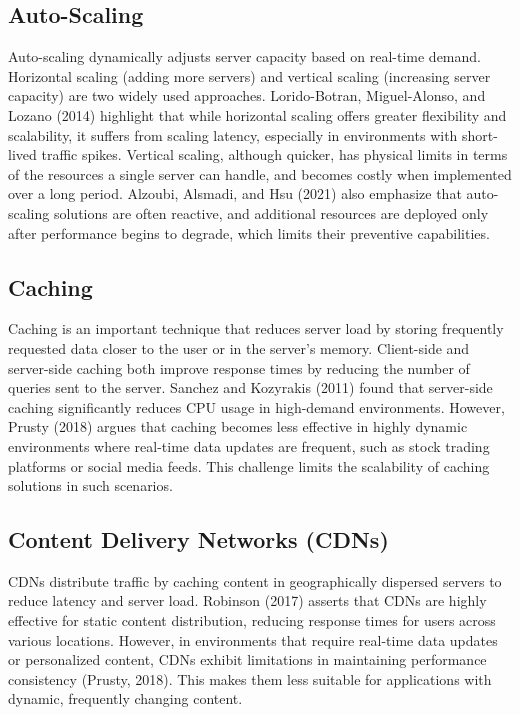 \documentclass[a4paper, 12pt]{article}
\begin{document}
\subsection{Auto-Scaling}

Auto-scaling dynamically adjusts server capacity based on real-time demand. Horizontal scaling (adding more servers) and vertical scaling (increasing server capacity) are two widely used approaches. Lorido-Botran, Miguel-Alonso, and Lozano (2014) highlight that while horizontal scaling offers greater flexibility and scalability, it suffers from scaling latency, especially in environments with short-lived traffic spikes. Vertical scaling, although quicker, has physical limits in terms of the resources a single server can handle, and becomes costly when implemented over a long period. Alzoubi, Alsmadi, and Hsu (2021) also emphasize that auto-scaling solutions are often reactive, and additional resources are deployed only after performance begins to degrade, which limits their preventive capabilities.

\subsection{Caching}

Caching is an important technique that reduces server load by storing frequently requested data closer to the user or in the server’s memory. Client-side and server-side caching both improve response times by reducing the number of queries sent to the server. Sanchez and Kozyrakis (2011) found that server-side caching significantly reduces CPU usage in high-demand environments. However, Prusty (2018) argues that caching becomes less effective in highly dynamic environments where real-time data updates are frequent, such as stock trading platforms or social media feeds. This challenge limits the scalability of caching solutions in such scenarios.

\subsection{Content Delivery Networks (CDNs)}

CDNs distribute traffic by caching content in geographically dispersed servers to reduce latency and server load. Robinson (2017) asserts that CDNs are highly effective for static content distribution, reducing response times for users across various locations. However, in environments that require real-time data updates or personalized content, CDNs exhibit limitations in maintaining performance consistency (Prusty, 2018). This makes them less suitable for applications with dynamic, frequently changing content.
\end{document}
